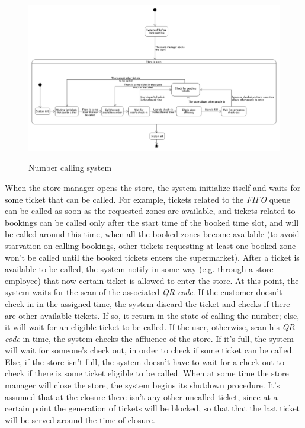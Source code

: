 \documentclass{article}
\begin{document}
		\begin{figure}[!h]
			
			\centering
			\includegraphics[scale=0.23]{statechart1.PNG} \\
			\caption{Number calling system}
			
		\end{figure}
	
		When the store manager opens the store, the system initialize itself and waits for some ticket that can be called. For example, tickets related to the \emph{FIFO} queue can be called as soon as the requested zones are available, and tickets related to bookings can be called only after the start time of the booked time slot, and will be called around this time, when all the booked zones become available (to avoid starvation on calling bookings, other tickets requesting at least one booked zone won't be called until the booked tickets enters the supermarket). After a ticket is available to be called, the system notify in some way (e.g. through a store employee) that now certain ticket is allowed to enter the store. At this point, the system waits for the scan of the associated \emph{QR code}. If the customer doesn't check-in in the assigned time, the system discard the ticket and checks if there are other available tickets. If so, it return in the state of calling the number; else, it will wait for an eligible ticket to be called. If the user, otherwise, scan his \emph{QR code} in time, the system checks the affluence of the store. If it's full, the system will wait for someone's check out, in order to check if some ticket can be called. Else, if the store isn't full, the system doesn't have to wait for a check out to check if there is some ticket eligible to be called. When at some time the store manager will close the store, the system begins its shutdown procedure. It's assumed that at the closure there isn't any other uncalled ticket, since at a certain point the generation of tickets will be blocked, so that that the last ticket will be served around the time of closure.
		
\end{document}
